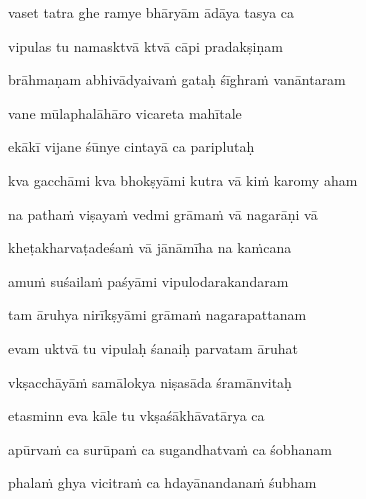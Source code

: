 vaset tatra ghe ramye bhāryām ādāya tasya ca\thinspace{\dandab} \dontdisplaylinenum

vipulas tu namasktvā ktvā cāpi pradakṣiṇam \veg\dontdisplaylinenum
{}

brāhmaṇam abhivādyaivaṁ gataḥ śīghraṁ vanāntaram\thinspace{\dandab} \dontdisplaylinenum

vane mūlaphalāhāro vicareta mahītale \veg\dontdisplaylinenum
{}

ekākī vijane śūnye cintayā ca pariplutaḥ\thinspace{\dandab} \dontdisplaylinenum

kva gacchāmi kva bhokṣyāmi kutra vā kiṁ karomy aham \veg\dontdisplaylinenum
{}

na pathaṁ viṣayaṁ vedmi grāmaṁ vā nagarāṇi vā\thinspace{\dandab} \dontdisplaylinenum

kheṭakharvaṭadeśaṁ vā jānāmīha na kaṁcana \veg\dontdisplaylinenum
{}

amuṁ suśailaṁ paśyāmi vipulodarakandaram\thinspace{\dandab} \dontdisplaylinenum

tam āruhya nirīkṣyāmi grāmaṁ nagarapattanam \veg\dontdisplaylinenum

evam uktvā tu vipulaḥ śanaiḥ parvatam āruhat\thinspace{\dandab} \dontdisplaylinenum

vkṣacchāyāṁ samālokya niṣasāda śramānvitaḥ \veg\dontdisplaylinenum
{}

etasminn eva kāle tu vkṣaśākhāvatārya ca\thinspace{\dandab} \dontdisplaylinenum

apūrvaṁ ca surūpaṁ ca sugandhatvaṁ ca śobhanam \veg\dontdisplaylinenum
{}

phalaṁ ghya vicitraṁ ca hdayānandanaṁ śubham\thinspace{\dandab} \dontdisplaylinenum

